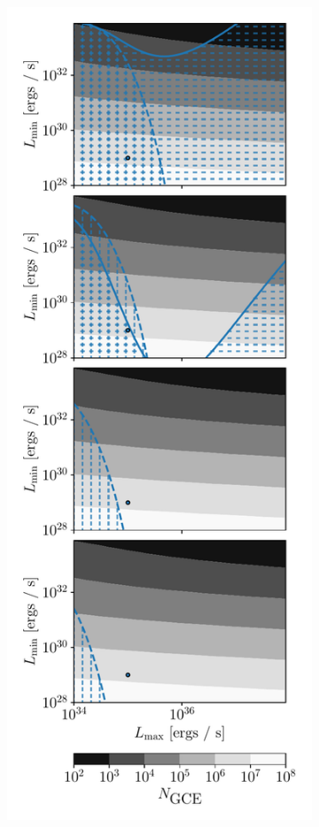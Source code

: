\documentclass[a4paper,11pt]{article}
\begin{document}
\begin{figure}
\centering
    \begin{subfigure}[h]{0.32\textwidth}
        \includegraphics[width=\textwidth]{figs/power-law-sensitivity.pdf}

\end{subfigure}
\end{figure}
\end{document}
